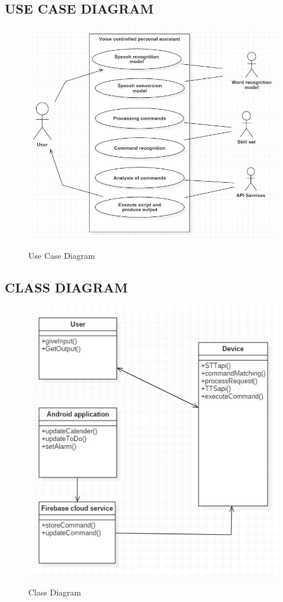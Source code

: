     \subsection*{USE CASE DIAGRAM}
    \begin{figure}[H]
    \centering
  \includegraphics[scale=0.75]{UseCase.JPG}\\
  \caption{Use Case Diagram}
  \end{figure}
    \pagebreak
    
        \subsection*{CLASS DIAGRAM}
    \begin{figure}[H]
    \centering
  \includegraphics[scale=0.75]{Class.JPG}\\
  \caption{Class Diagram}
\end{figure}

